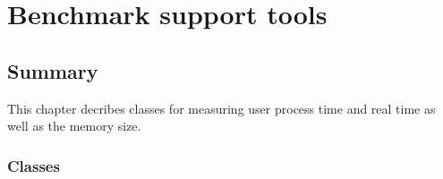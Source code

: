 
\ccParDims

\clearpage
\chapter{Benchmark support tools}

\section*{Summary}

This chapter decribes classes for measuring user process time and real time
as well as the memory size.

\subsection*{Classes}
\\
\\
\\
